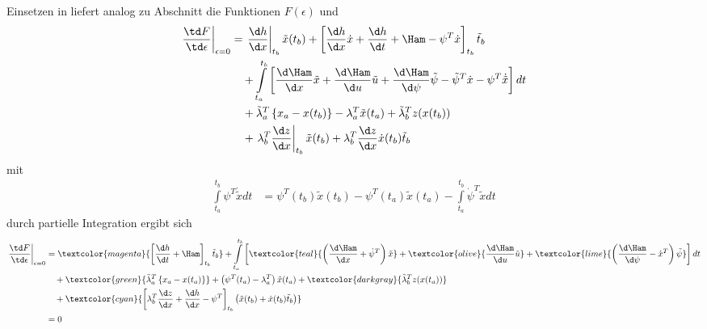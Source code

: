 Einsetzen in  liefert analog zu Abschnitt  die Funktionen $F(\epsilon)$ und
\begin{align*}
	\left.\frac{\td F}{\td \epsilon}\right|_{\epsilon=0} & = \left.\frac{\d h}{\d x}\right|_{t_b}\tilde{x}(t_b) + \left[\frac{\d h}{\d x}\dot{x} +
	\frac{\d h}{\d t}+\Ham - \psi^T\dot{x} \right]_{t_b}\tilde{t}_b\\ 
	& \quad + \int\limits_{t_a}^{t_b}\left[\frac{\d\Ham}{\d
	x}\tilde{x}+\frac{\d\Ham}{\d u}\tilde{u}+\frac{\d\Ham}{\d\psi}\tilde{\psi} - \tilde{\psi}^T\dot{x} - \psi^T\dot{\tilde{x}}\right]dt \\
	& \quad + \tilde{\lambda}_a^T\left\{x_a-x(t_b) \right\} - \lambda_a^T\tilde{x}(t_a)+\tilde{\lambda}_b^T z(x(t_b)) \\
	& \quad + \left.\lambda_b^T\frac{\d z}{\d x}\right|_{t_b}\tilde{x}(t_b)+\lambda_b^T\frac{\d z}{\d x}\dot{x}(t_b)\tilde{t}_b
\end{align*}
mit 
\begin{align*}
	\int\limits_{t_a}^{t_b}\psi^T\dot{\tilde{x}}dt & = \psi^T(t_b)\tilde{x}(t_b)-\psi^T(t_a)\tilde{x}(t_a)-\int\limits_{t_a}^{t_b}\dot{\psi}^T\tilde{x}dt
\end{align*} 
durch partielle Integration ergibt sich
\begin{align*}
\left.\frac{\td F}{\td \epsilon}\right|_{\epsilon=0} & = \textcolor{magenta}{\left[\frac{\d h}{\d t}+\Ham \right]_{t_b}\tilde{t}_b} + \int\limits_{t_a}^{t_b}\left[
\textcolor{teal}{\left(\frac{\d\Ham}{\d x}+\dot{\psi}^T \right)\tilde{x}} + \textcolor{olive}{\frac{\d\Ham}{\d u}\tilde{u}} +
\textcolor{lime}{\left(\frac{\d\Ham}{\d\psi}-\dot{x}^T \right)\tilde{\psi}} \right]dt\\
& \quad + \textcolor{green}{\tilde{\lambda}_a^T\left\{x_a - x(t_a) \right\}} + \left(\psi^T(t_a) - \lambda_a^T \right)\tilde{x}(t_a) +
\textcolor{darkgray}{\tilde{\lambda}_b^Tz(x(t_a))} \\
& \quad + \textcolor{cyan}{ \left[\lambda_b^T\frac{\d z}{\d x}+\frac{\d h}{\d x}-\psi^T \right]_{t_b}\left(\tilde{x}(t_b)+\dot{x}(t_b)\tilde{t}_b \right)}\\
& = 0
\end{align*}


